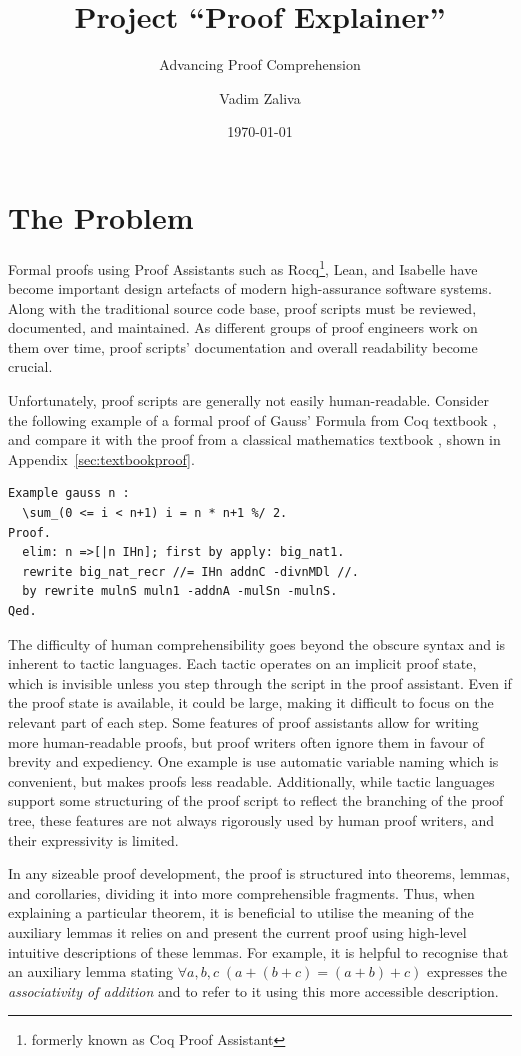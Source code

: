 \documentclass[10pt,nonacm,natbib=false]{acmart}
\title{Project ``Proof Explainer''}
\subtitle{Advancing Proof Comprehension}
\date{\today} %
\author{Vadim Zaliva}
\begin{document}
\maketitle

\section*{The Problem}

Formal proofs using Proof Assistants such as Rocq\footnote{formerly
  known as Coq Proof Assistant}, Lean, and Isabelle have become important design
artefacts of modern high-assurance software systems. Along with the
traditional source code base, proof scripts must be reviewed,
documented, and maintained. As different groups of proof engineers
work on them over time, proof scripts' documentation and overall
readability become crucial.

Unfortunately, proof scripts are generally not easily
human-readable. Consider the following example of a formal proof of
Gauss' Formula from Coq textbook \cite{mahboubi2021mathematical}, and
compare it with the proof from a classical mathematics textbook
\cite{roberts2014introduction}, shown in Appendix~\ref{sec:textbookproof}.

\begin{lstlisting}
Example gauss n :
  \sum_(0 <= i < n+1) i = n * n+1 %/ 2.
Proof.
  elim: n =>[|n IHn]; first by apply: big_nat1.
  rewrite big_nat_recr //= IHn addnC -divnMDl //.
  by rewrite mulnS muln1 -addnA -mulSn -mulnS.
Qed.
\end{lstlisting}

The difficulty of human comprehensibility goes beyond the obscure
syntax and is inherent to tactic languages. Each tactic operates on an
implicit proof state, which is invisible unless you step through the
script in the proof assistant. Even if the proof state is available,
it could be large, making it difficult to focus on the relevant part
of each step. Some features of proof assistants allow for writing more
human-readable proofs, but proof writers often ignore them in favour
of brevity and expediency. One example is use automatic variable
naming which is convenient, but makes proofs less
readable. Additionally, while tactic languages support some
structuring of the proof script to reflect the branching of the proof
tree, these features are not always rigorously used by human proof
writers, and their expressivity is limited.

In any sizeable proof development, the proof is structured into
theorems, lemmas, and corollaries, dividing it into more
comprehensible fragments.  Thus, when explaining a particular theorem,
it is beneficial to utilise the meaning of the auxiliary lemmas it
relies on and present the current proof using high-level intuitive
descriptions of these lemmas. For example, it is helpful to recognise
that an auxiliary lemma stating
$\forall a, b, c \; (a + (b + c) = (a + b) + c)$ expresses the
\textit{associativity of addition} and to refer to it using this more
accessible description.
\end{document}

